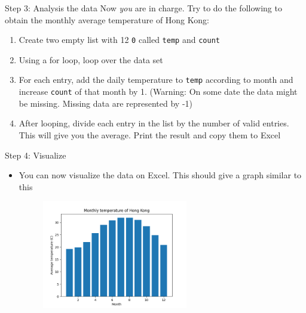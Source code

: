 \documentclass[10pt,xcolor={table,dvipsnames},t]{beamer}
\begin{document}
\begin{frame}{Step 3: Analysis the data}
  Now \textit{you} are in charge. Try to do the following to obtain the monthly average temperature of Hong Kong:
  \begin{enumerate}
    \item Create two empty list with 12 \texttt{0} called \texttt{temp} and \texttt{count} 
    \item Using a for loop, loop over the data set
    \item For each entry, add the daily temperature to \texttt{temp} according to month and increase \texttt{count} of that month by 1. (Warning: On some date the data might be missing. Missing data are represented by -1)
    \item After looping, divide each entry in the list by the number of valid entries. This will give you the average. Print the result and copy them to Excel
  \end{enumerate}
\end{frame}

\begin{frame}{Step 4: Visualize}
  \begin{itemize}
    \item You can now visualize the data on Excel. This should give a graph similar to this
    \begin{figure}
      \centering
      \includegraphics[width=0.6\textwidth]{img/month-temp.png}
    \end{figure}
  \end{itemize}
\end{frame}
\end{document}
